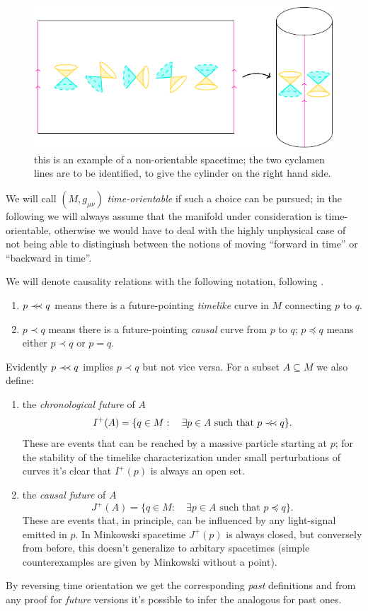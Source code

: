 \begin{figure}
	\caption[]{this is an example of a non-orientable spacetime; the two cyclamen lines are to be identified, to give the cylinder on the right hand side.}
	\label{fig:time-orientable}
	\centering
	\includegraphics[scale=1.2]{Immagini/time-orientable/time-orientable.pdf}
\end{figure}


We will call \((M, g_{\mu\nu})\) \emph{time-orientable} if such a  choice can be pursued; in the following we will always assume that the manifold under consideration is time-orientable, otherwise we would have to deal with the highly unphysical case of not being able to distingiush between the notions of moving ``forward in time'' or ``backward in time''.

We will denote causality relations with the following notation, following \cite{o1983semi}.
\begin{enumerate}
	\item  \(p \prec\mathrel{\mkern-5mu}\prec q\) means there is a future-pointing \emph{timelike} curve in \(M\) connecting \(p\) to \(q\).
	\item \(p \prec q\) means there is a future-pointing \emph{causal} curve from \(p\) to \(q\); \(p \preceq q\) means either \(p \prec q\) or \(p = q\).
\end{enumerate}

Evidently \(p\prec\mathrel{\mkern-5mu}\prec q\) implies \(p\prec q\) but not vice versa. For a subset \(A \subseteq M\) we also define:
\begin{enumerate}
	\item the \emph{chronological future} of \(A\)
	\[
	I^+(A) =\{ q\in M :\quad\exists p \in A\text{ such that } p\prec\mathrel{\mkern-5mu}\prec q\}.
	\]
	These are events that can be reached by a massive particle starting at \(p\); for the stability of the timelike characterization under small perturbations of curves it's clear that \(I^+(p)\) is always an open set.
	\item the \emph{causal future} of \(A\)
	\[
	J^+(A) =\{ q\in M : \quad\exists p \in A\text{ such that } p\preceq q\}.
	\]
	These are events that, in principle, can be influenced by any light-signal emitted in \(p\). In Minkowski spacetime \(J^+(p)\) is always closed, but conversely from before, this doesn't generalize to arbitary spacetimes (simple counterexamples are given by Minkowski without a point).
\end{enumerate}
By reversing time orientation we get the corresponding \emph{past} definitions and from any proof for \emph{future} versions it's possible to infer the analogous for past ones.

